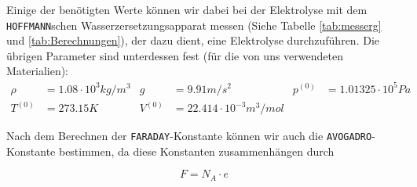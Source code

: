 \documentclass[10pt,a4paper]{article}
\begin{document}
\begin{flushleft}
Einige der benötigten Werte können wir dabei bei der Elektrolyse mit dem \texttt{HOFFMANN}schen Wasserzersetzungsapparat messen (Siehe Tabelle \ref{tab:messerg} und \ref{tab:Berechnungen}), der dazu dient, eine Elektrolyse durchzuführen. Die übrigen Parameter sind unterdessen fest (für die von uns verwendeten Materialien):
\begin{align*}
\rho &= 1.08 \cdot 10^3 kg/m^3 & g &= 9.91 m/s^2 & p^{(0)} &= 1.01325 \cdot 10^5 Pa \\ T^{(0)} &= 273.15 K & V^{(0)} &= 22.414 \cdot 10^{-3} m^3/mol
\end{align*}

Nach dem Berechnen der \texttt{FARADAY}-Konstante können wir auch die \texttt{AVOGADRO}-Konstante bestimmen, da diese Konstanten zusammenhängen durch

\begin{equation}
F = N_A \cdot e
\end{equation}
\end{flushleft}
\end{document}
